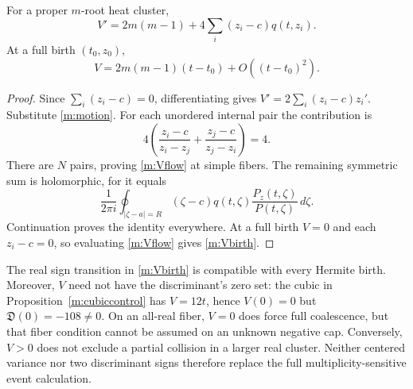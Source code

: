 \begin{proposition}\label{m:variance}
For a proper $m$-root heat cluster,
\begin{equation}\label{m:Vflow}
 V'=2m(m-1)+4\sum_i(z_i-c)q(t,z_i).
\end{equation}
At a full birth $(t_0,z_0)$,
\begin{equation}\label{m:Vbirth}
 V=2m(m-1)(t-t_0)+O((t-t_0)^2).
\end{equation}
\end{proposition}
\begin{proof}
Since $\sum_i(z_i-c)=0$, differentiating gives
$V'=2\sum_i(z_i-c)z_i'$.  Substitute \eqref{m:motion}.  For
each unordered internal pair the contribution is
\[
 4\left(\frac{z_i-c}{z_i-z_j}
       +\frac{z_j-c}{z_j-z_i}\right)=4.
\]
There are $N$ pairs, proving \eqref{m:Vflow} at simple fibers.  The
remaining symmetric sum is holomorphic, for it equals
\[
 \frac{1}{2\pi i}\oint_{|\zeta-a|=R}
       (\zeta-c)q(t,\zeta)\frac{P_z(t,\zeta)}{P(t,\zeta)}\,d\zeta.
\]
Continuation proves the identity everywhere.  At a full birth $V=0$
and each $z_i-c=0$, so evaluating \eqref{m:Vflow} gives
\eqref{m:Vbirth}.
\end{proof}

The real sign transition in \eqref{m:Vbirth} is compatible with
every Hermite birth.  Moreover, $V$ need not have the discriminant's
zero set: the cubic in Proposition~\ref{m:cubiccontrol} has
$V=12t$, hence $V(0)=0$ but $\mathfrak D(0)=-108\ne0$.
On an all-real fiber, $V=0$ does force full coalescence, but that
fiber condition cannot be assumed on an unknown negative cap.
Conversely, $V>0$ does not exclude a partial collision in a larger
real cluster.  Neither centered variance nor two discriminant signs
therefore replace the full multiplicity-sensitive event calculation.
